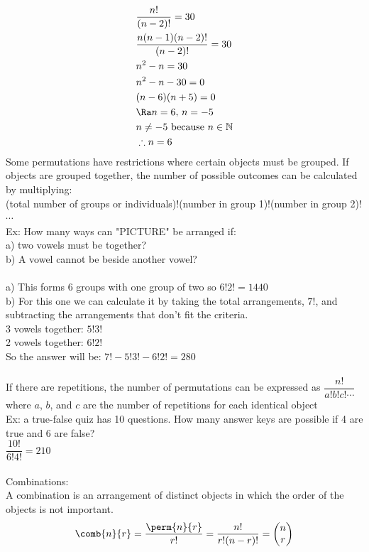 \begin{align*}
    &\frac{n!}{(n-2)!}=30\\
    &\frac{n(n-1)(n-2)!}{(n-2)!}=30\\
    &n^2-n=30\\
    &n^2-n-30=0\\
    &(n-6)(n+5)=0\\
    &\Ra n=6,\,n=-5\\
    &n\neq-5\text{ because }n\in\mathbb{N}\\
    &\therefore n=6
\end{align*}
Some permutations have restrictions where certain objects must be grouped. If objects are grouped together, the number of possible outcomes can be calculated by multiplying:\\
(total number of groups or individuals)!(number in group 1)!(number in group 2)!$\cdots$\\
Ex: How many ways can "PICTURE" be arranged if:\\
a) two vowels must be together?\\
b) A vowel cannot be beside another vowel?\\
\\
a) This forms 6 groups with one group of two so $6!2!=1440$\\
b) For this one we can calculate it by taking the total arrangements, $7!$, and subtracting the arrangements that don't fit the criteria.\\
3 vowels together: $5!3!$\\
2 vowels together: $6!2!$\\
So the answer will be: $7!-5!3!-6!2!=280$\\
\\
If there are repetitions, the number of permutations can be expressed as $\dfrac{n!}{a!b!c!\cdots}$ where $a$, $b$, and $c$ are the number of repetitions for each identical object\\
Ex: a true-false quiz has 10 questions. How many answer keys are possible if 4 are true and 6 are false?\\
$\dfrac{10!}{6!4!}=210$\\
\\
Combinations:\\
A combination is an arrangement of distinct objects in which the order of the objects is not important.
$$\comb{n}{r}=\frac{\perm{n}{r}}{r!}=\frac{n!}{r!(n-r)!}=\left(\begin{matrix} n\\r\end{matrix}\right)$$
